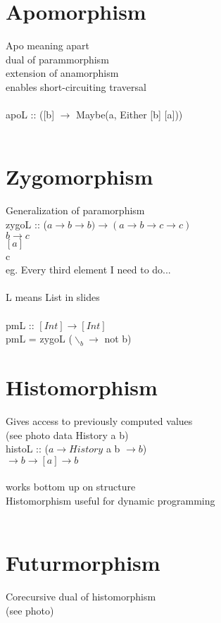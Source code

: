 \documentclass{article}
\begin{document}
\section{Apomorphism}
Apo meaning apart
\\
dual of parammorphism
\\
extension of anamorphism
\\
enables short-circuiting traversal
\\
\\
apoL :: ([b] $\rightarrow$ Maybe(a, Either [b] [a]))
\\
\\
\section{Zygomorphism}
Generalization of paramorphism
\\
zygoL :: ($a \rightarrow b \rightarrow b) \rightarrow (a \rightarrow b \rightarrow c \rightarrow c)$
\\
$ b \rightarrow c$
\\
$[a]$
\\
c
\\
eg. Every third element I need to do...
\\
\\
L means List in slides
\\
\\
pmL :: $[Int] \rightarrow [Int]$
\\
pmL = zygoL ($\backslash_ b \rightarrow$ not b)
\\
\section{Histomorphism}
Gives access to previously computed values
\\
(see photo data History a b)
\\
histoL :: ($a \rightarrow History$ a b $\rightarrow b$)
\\
$\rightarrow b \rightarrow [a] \rightarrow b$
\\
\\
works bottom up on structure
\\
Histomorphism useful for dynamic programming
\\
\\
\section{Futurmorphism}
Corecursive dual of histomorphism
\\
(see photo)
\\
\\
\end{document}
